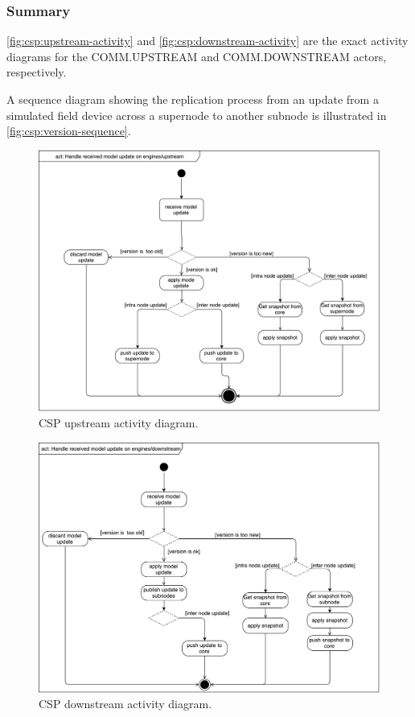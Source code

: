 \subsubsection{Summary}
\autoref{fig:csp:upstream-activity} and \autoref{fig:csp:downstream-activity}
are the exact activity diagrams for the COMM.UPSTREAM and COMM.DOWNSTREAM
actors, respectively.

A sequence diagram showing the replication process from an update from a
simulated field device across a supernode to another subnode is illustrated in
\autoref{fig:csp:version-sequence}.

\begin{figure}[]
	\includegraphics[width=\textwidth]{img/activity_diagram_upstream.pdf}
	\caption{CSP upstream activity diagram.}
	\label{fig:csp:upstream-activity}
\end{figure}

\begin{figure}[]
	\includegraphics[width=\textwidth]{img/activity_diagram_downstream.pdf}
	\caption{CSP downstream activity diagram.}
	\label{fig:csp:downstream-activity}
\end{figure}

